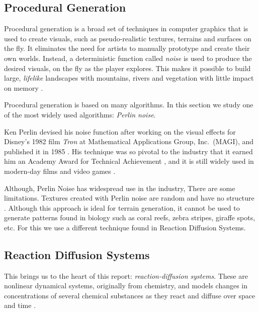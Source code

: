 \documentclass[a4paper, 11pt]{article}
\begin{document}
\subsection{Procedural Generation}
\label{sec:procedural}

Procedural generation is a broad set of techniques in computer graphics that is used to create visuals, such as pseudo-realistic textures, terrains and surfaces on the fly. It eliminates the need for artists to manually prototype and create their own worlds. Instead, a deterministic function called \emph{noise} is used to produce the desired visuals, on the fly as the player explores. This makes it possible to build large, \emph{lifelike} landscapes with mountains, rivers and vegetation with little impact on memory \parencite{lagae2010}.


Procedural generation is based on many algorithms. In this section we study one of the most widely used algorithms: \emph{Perlin noise}.


Ken Perlin devised his noise function after working on the visual effects for Disney's 1982 film \emph{Tron} at Mathematical Applications Group, Inc.\ (MAGI), and published it in 1985 \parencite{perlin1985}. His technique was so pivotal to the industry that it earned him an Academy Award for Technical Achievement \parencite{nyuperlin}, and it is still widely used in modern-day films and video games \parencite{lagae2010}.

Although, Perlin Noise has widespread use in the industry, There are some limitations.
Textures created with Perlin noise are random and have no structure \parencite{lagae2010}. Although this approach is ideal for terrain generation, it cannot be used to generate patterns found in biology such as coral reefs, zebra stripes, giraffe spots, etc. For this we use a different technique found in Reaction Diffusion Systems.


\subsection{Reaction Diffusion Systems}
\label{sec:rd-systems}

This brings us to the heart of this report: \emph{reaction-diffusion systems}. These are nonlinear dynamical systems, originally from chemistry, and models changes in concentrations of several chemical substances as they react and diffuse over space and time \parencite{turing1952}.
\end{document}
